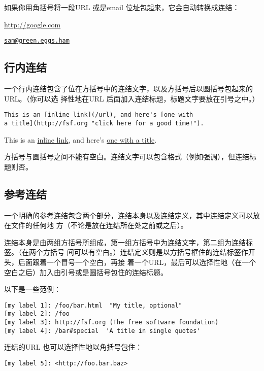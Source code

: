 \documentclass[cn]{elegantbook}
\begin{document}
如果你用角括号将一段URL 或是email 位址包起来，它会自动转换成连结：

\url{http://google.com}

\href{mailto:sam@green.eggs.ham}{\nolinkurl{sam@green.eggs.ham}}

\hypertarget{ux884cux5185ux8fdeux7ed3}{%
\subsection{行内连结}\label{ux884cux5185ux8fdeux7ed3}}

一个行内连结包含了位在方括号中的连结文字，以及方括号后以圆括号包起来的URL。（你可以选
择性地在URL 后面加入连结标题，标题文字要放在引号之中。）

\begin{lstlisting}
This is an [inline link](/url), and here's [one with
a title](http://fsf.org "click here for a good time!").
\end{lstlisting}

This is an \href{/url}{inline link}, and here's
\href{http://fsf.org}{one with a title}.

方括号与圆括号之间不能有空白。连结文字可以包含格式（例如强调），但连结标题则否。

\hypertarget{ux53c2ux8003ux8fdeux7ed3}{%
\subsection{参考连结}\label{ux53c2ux8003ux8fdeux7ed3}}

一个明确的参考连结包含两个部分，连结本身以及连结定义，其中连结定义可以放在文件的任何地
方（不论是放在连结所在处之前或之后）。

连结本身是由两组方括号所组成，第一组方括号中为连结文字，第二组为连结标签。（在两个方括号
间可以有空白。）连结定义则是以方括号框住的连结标签作开头，后面跟着一个冒号一个空白，再接
着一个URL，最后可以选择性地（在一个空白之后）加入由引号或是圆括号包住的连结标题。

以下是一些范例：

\begin{lstlisting}
[my label 1]: /foo/bar.html  "My title, optional"
[my label 2]: /foo
[my label 3]: http://fsf.org (The free software foundation)
[my label 4]: /bar#special  'A title in single quotes'
\end{lstlisting}

连结的URL 也可以选择性地以角括号包住：

\begin{lstlisting}
[my label 5]: <http://foo.bar.baz>
\end{lstlisting}
\end{document}
